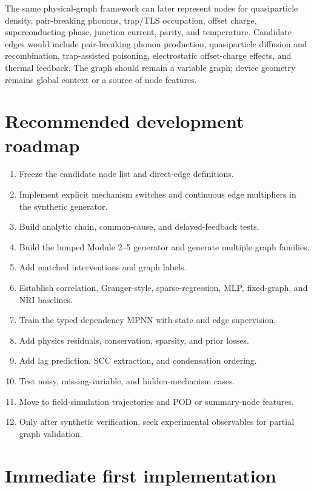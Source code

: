 \documentclass[11pt]{article}
\begin{document}
The same physical-graph framework can later represent nodes for quasiparticle density, pair-breaking phonons, trap/TLS occupation, offset charge, superconducting phase, junction current, parity, and temperature. Candidate edges would include pair-breaking phonon production, quasiparticle diffusion and recombination, trap-assisted poisoning, electrostatic offset-charge effects, and thermal feedback. The graph should remain a variable graph; device geometry remains global context or a source of node features.

\section{Recommended development roadmap}

\begin{enumerate}[leftmargin=1.6em]
    \item Freeze the candidate node list and direct-edge definitions.
    \item Implement explicit mechanism switches and continuous edge multipliers in the synthetic generator.
    \item Build analytic chain, common-cause, and delayed-feedback tests.
    \item Build the lumped Module 2--5 generator and generate multiple graph families.
    \item Add matched interventions and graph labels.
    \item Establish correlation, Granger-style, sparse-regression, MLP, fixed-graph, and NRI baselines.
    \item Train the typed dependency MPNN with state and edge supervision.
    \item Add physics residuals, conservation, sparsity, and prior losses.
    \item Add lag prediction, SCC extraction, and condensation ordering.
    \item Test noisy, missing-variable, and hidden-mechanism cases.
    \item Move to field-simulation trajectories and POD or summary-node features.
    \item Only after synthetic verification, seek experimental observables for partial graph validation.
\end{enumerate}

\section{Immediate first implementation}
\end{document}
